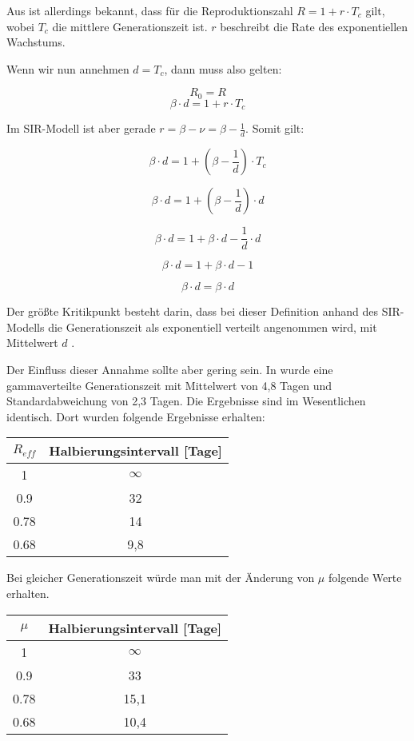 \documentclass[a4paper]{article}
\begin{document}
    Aus \cite{generationTime} ist allerdings bekannt, dass für die Reproduktionszahl $R=1+r \cdot T_c$ gilt, wobei $T_c$ die mittlere Generationszeit ist. $r$ beschreibt die Rate des exponentiellen Wachstums. 

    Wenn wir nun annehmen $d = T_c$, dann muss also gelten: 

    $$ R_{0} = R $$
    $$ \beta \cdot d = 1 + r \cdot T_c $$

    Im SIR-Modell ist aber gerade $r=\beta - \nu=\beta - \frac{1}{d}$. Somit gilt: 

    $$ \beta \cdot d = 1 + (\beta - \frac{1}{d}) \cdot T_c $$

    $$ \beta \cdot d = 1 + (\beta - \frac{1}{d}) \cdot d $$

    $$ \beta \cdot d = 1 + \beta \cdot d - \frac{1}{d} \cdot d  $$

    $$ \beta \cdot d = 1 + \beta \cdot d -1  $$

    $$ \beta \cdot d = \beta \cdot d  $$

    Der größte Kritikpunkt besteht darin, dass bei dieser Definition anhand des SIR-Modells die Generationszeit als exponentiell verteilt angenommen wird, mit Mittelwert $d$ \cite{generationTime}. 

    Der Einfluss dieser Annahme sollte aber gering sein. In \cite{althausTwitter} wurde eine gammaverteilte Generationszeit mit Mittelwert von 4,8 Tagen und Standardabweichung von 2,3 Tagen. Die Ergebnisse sind im Wesentlichen identisch. Dort wurden folgende Ergebnisse erhalten: 

    \begin{center}
        \begin{tabular}{ |c||c| } 
            \hline
                $R_{eff}$ & Halbierungsintervall [Tage] \\
                \hline\hline
                1 & $\infty$ \\ 
                0.9 & 32 \\ 
                0.78 & 14 \\ 
                0.68 & 9,8 \\ 
            \hline
        \end{tabular}
    \end{center}

    Bei gleicher Generationszeit würde man mit der Änderung von $\mu$ folgende Werte erhalten.

    \begin{center}
        \begin{tabular}{ |c||c| } 
            \hline
                $\mu$ & Halbierungsintervall [Tage] \\
                \hline\hline
                1 & $\infty$ \\ 
                0.9 & 33 \\ 
                0.78 & 15,1 \\ 
                0.68 & 10,4 \\ 
            \hline
        \end{tabular}
    \end{center}
\end{document}
